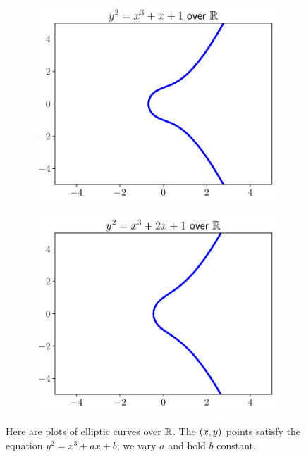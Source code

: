 \begin{figure}[p]
    \begin{subfigure}[t]{0.45\textwidth}
    \includegraphics[width=\textwidth]{plots/ec_reals/ec_reals_1_1.pdf}
    \end{subfigure}
    \begin{subfigure}[t]{0.45\textwidth}
    \includegraphics[width=\textwidth]{plots/ec_reals/ec_reals_2_1.pdf}
    \end{subfigure}
    \caption[Plots of elliptic curves over the reals 1]{Here
        are plots of \glspl{elliptic curve} over $\mathbb{R}$.
        The $\left( x,y \right)$ points satisfy the equation
        $y^{2} = x^{3} + ax + b$;
        we vary $a$ and hold $b$ constant.}
    \label{fig:ec_real_plots_1}
\end{figure}

